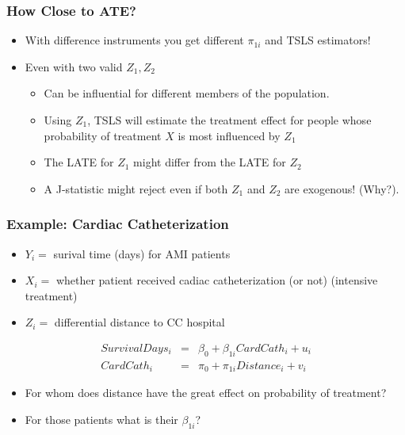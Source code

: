 \documentclass[xcolor=pdftex,dvipsnames,table,mathserif]{beamer}
\begin{document}
\begin{frame}
\frametitle{How Close to ATE?}
\begin{itemize}
\item With difference instruments you get different $\pi_{1i}$ and TSLS estimators!
\item Even with two valid $Z_1, Z_2$
\begin{itemize}
\item Can be influential for different members of the population.
\item Using $Z_1$, TSLS will estimate the treatment effect for people whose probability of treatment $X$ is most influenced by $Z_1$
\item The LATE for $Z_1$ might differ from the LATE for $Z_2$
\item A J-statistic might reject even if both $Z_1$ and $Z_2$ are exogenous! (Why?).
\end{itemize}
\end{itemize}
\end{frame}


\begin{frame}
\frametitle{Example: Cardiac Catheterization}
\begin{itemize}
\item $Y_i=$ surival time (days) for AMI patients
\item $X_i=$ whether patient received cadiac catheterization (or not) (intensive treatment)
\item $Z_i=$ differential distance to CC hospital
\end{itemize}
\begin{eqnarray*}
SurvivalDays_i &=& \beta_0 + \beta_{1i} CardCath_i + u_i\\
CardCath_i &=& \pi_0 + \pi_{1i} Distance_i + v_i
\end{eqnarray*}
\begin{itemize}
\item For whom does distance have the great effect on probability of treatment?
\item For those patients what is their $\beta_{1i}$?
\end{itemize}
\end{frame}
\end{document}
